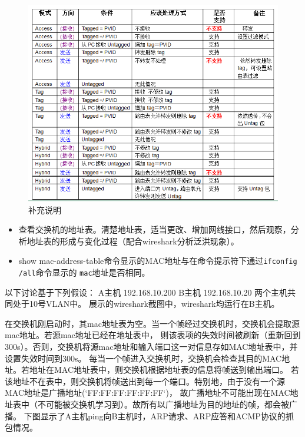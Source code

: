 \documentclass{myreport}
\begin{document}
\begin{figure}[htp]
    \centering
    \includegraphics[width=13cm]{"./figure/194156585.png"}
    \caption{补充说明}
    \label{fig:e1}
\end{figure}


\begin{tcolorbox}[title = {观察四}]
    
    \begin{itemize}
        \item 查看交换机的地址表。清楚地址表，适当更改、增加网线接口，然后观察，分析地址表的形成与变化过程（配合wireshark分析泛洪现象）。
        \item show mac-address-table命令显示的MAC地址与在命令提示符下通过\texttt{ifconfig /all}命令显示的 \texttt{mac}地址是否相同。
    \end{itemize}
    
\end{tcolorbox}
以下讨论基于下列假设：
A主机 192.168.10.200
B主机 192.168.10.20
两个主机共同处于10号VLAN中。
展示的wireshark截图中，wireshark均运行在B主机。

在交换机刚启动时，其mac地址表为空。当一个帧经过交换机时，交换机会提取源mac地址。若源mac地址已经在地址表中，
则该表项的失效时间被刷新（重新回到300s）。否则，交换机将源mac地址和输入端口这一对信息存如MAC地址表中，并设置失效时间到300s。
每当一个帧进入交换机时，交换机会检查其目的MAC地址。若地址在MAC地址表中，则交换机根据地址表的信息将帧送到输出端口。
若该地址不在表中，则交换机将帧送出到每一个端口。特别地，由于没有一个源MAC地址是广播地址(`FF:FF:FF:FF:FF:FF`)，
故广播地址不可能出现在MAC地址表中（不可能被交换机学习到）。故所有以广播地址为目的地址的帧，都会被广播。
下图显示了A主机ping向B主机时，ARP请求、ARP应答和ACMP协议的抓包情况。\\ 
\end{document}
